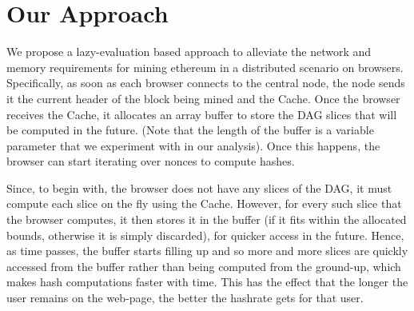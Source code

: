 \documentclass[10pt, conference, compsocconf]{IEEEtran}
\newcommand{\dennis}[1]{{\color{cyan}\bfseries[Dennis: #1]}}
\begin{document}
 


\section{Our Approach}
We propose a lazy-evaluation based approach to alleviate the network and memory requirements for mining ethereum in a distributed scenario on browsers. Specifically, as soon as each browser connects to the central node, the node sends it the current header of the block being mined and the Cache. Once the browser receives the Cache, it allocates an array buffer to store the DAG slices that will be computed in the future. (Note that the length of the buffer is a variable parameter that we experiment with in our analysis). Once this happens, the browser can start iterating over nonces to compute hashes.  

Since, to begin with, the browser does not have any slices of the DAG, it must compute each slice on the fly using the Cache. However, for every such slice that the browser computes, it then stores it in the buffer (if it fits within the allocated bounds, otherwise it is simply discarded), for quicker access in the future. Hence, as time passes, the buffer starts filling up and so more and more slices are quickly accessed from the buffer rather than being computed from the ground-up, which makes hash computations faster with time. This has the effect that the longer the user remains on the web-page, the better the hashrate gets for that user. 
\end{document}
